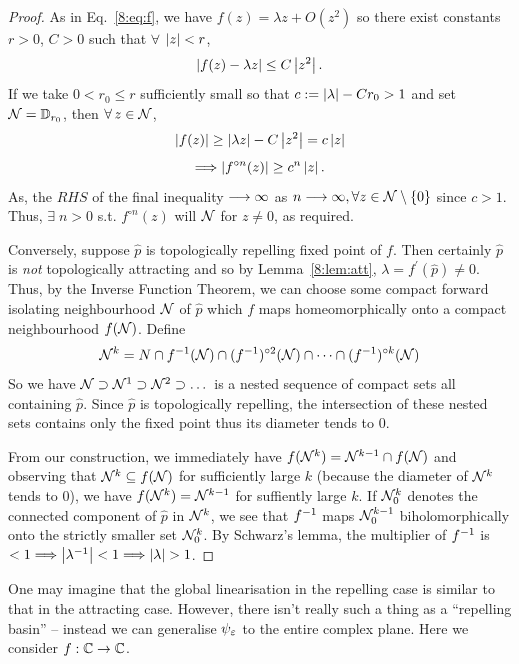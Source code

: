 \documentclass[../main.tex]{subfiles}
\begin{document}
\begin{proof}
    As in Eq.~\ref{8:eq:f}, we have $f(z)=\lambda z + O(z^2)$ so there exist constants $r>0$, $C>0$ such that $\forall$ $\left|z\right|<r$,
    \begin{equation*}
        \left|f(z)-\lambda z\right| \leq C\left|z^{2}\right|.
    \end{equation*}
     If we take $0 < r_{0} \leq r$ sufficiently small so that $c := \left|\lambda\right| - Cr_{0} > 1$ and set $\mathcal{N} = \mathbb{D}_{r_{0}}$, then $\forall\, z \in \mathcal{N}$,
     \[
    \left|f(z)\right| \geq\left|\lambda z\right|-C\left|z^{2}\right| = c\left|z\right|
     \]
     \[
    \Longrightarrow \left|f^{\circ n}(z)\right| \geq c^{n}\left|z\right|.
    \]
    As, the $RHS$ of the final inequality $\longrightarrow \infty$ as $n \longrightarrow \infty, \forall z \in \mathcal{N} \setminus \{0\}$ since $c > 1$. Thus, $\exists\; n>0$ s.t. $f^{\circ n}(z)$ will $\mathcal{N}$ for $z\ne 0$, as required.

    Conversely, suppose $\hat{p}$ is topologically repelling fixed point of $f$. Then certainly $\hat{p}$ is \emph{not} topologically attracting and so by Lemma~\ref{8:lem:att}, $\lambda = f^{\prime}(\hat{p}) \neq 0$. Thus, by the Inverse Function Theorem, we can choose some compact forward isolating neighbourhood $\mathcal{N}$ of $\hat{p}$ which $f$ maps homeomorphically onto a compact neighbourhood $f(\mathcal{N})$. Define
    \begin{equation*}
        \mathcal{N}^k=N \cap f^{-1}(\mathcal{N}) \cap (f^{-1})^{\circ2}(\mathcal{N})\cap \dots \cap (f^{-1})^{\circ k}(\mathcal{N})
    \end{equation*}
    So we have $\mathcal{N} \supset \mathcal{N}^1 \supset \mathcal{N}^2 \supset \dots$ is a nested sequence of compact sets all containing $\hat{p}$. Since $\hat{p}$ is topologically repelling, the intersection of these nested sets contains only the fixed point thus its diameter tends to 0. 
    
    From our construction, we immediately have $f(\mathcal{N}^k) = \mathcal{N}^{k-1} \cap f(\mathcal{N})$ and observing that $\mathcal{N}^k\subseteq f(\mathcal{N})$ for sufficiently large $k$ (because the diameter of $\mathcal{N}^k$ tends to 0),
     we have $f(\mathcal{N}^k) = \mathcal{N}^{k-1}$ for suffiently large $k$. If $\mathcal{N}_0^k$ denotes the connected component of $\hat{p}$ in $\mathcal{N}^k$, we see that $f^{-1}$ maps $\mathcal{N}_0^{k-1}$ biholomorphically onto the strictly smaller set $\mathcal{N}_0^k$. By Schwarz's lemma, the multiplier of $f^{-1}$ is $<1 \Longrightarrow \left|\lambda^{-1}\right| < 1 \Longrightarrow \left|\lambda\right| > 1$. 
\end{proof}

One may imagine that the global linearisation in the repelling case is similar to that in the attracting case. However, there isn't really such a thing as a ``repelling basin'' -- instead we can generalise $\psi_{\varepsilon}$ to the entire complex plane. Here we consider $f : \mathbb{C} \rightarrow \mathbb{C}$.
\end{document}
